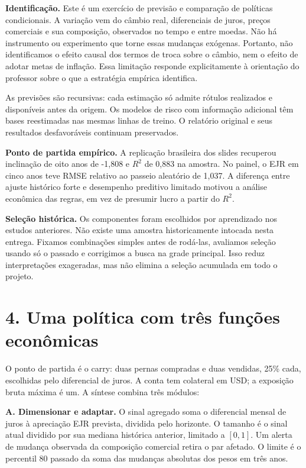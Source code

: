 \documentclass[11pt,a4paper]{article}
\begin{document}
\textbf{Identificação.} Este é um exercício de previsão e comparação de políticas condicionais. A variação vem do câmbio real, diferenciais de juros, preços comerciais e sua composição, observados no tempo e entre moedas. Não há instrumento ou experimento que torne essas mudanças exógenas. Portanto, não identificamos o efeito causal dos termos de troca sobre o câmbio, nem o efeito de adotar metas de inflação. Essa limitação responde explicitamente à orientação do professor sobre o que a estratégia empírica identifica.

As previsões são recursivas: cada estimação só admite rótulos realizados e disponíveis antes da origem. Os modelos de risco com informação adicional têm bases reestimadas nas mesmas linhas de treino. O relatório original e seus resultados desfavoráveis continuam preservados.

\textbf{Ponto de partida empírico.} A replicação brasileira dos slides recuperou inclinação de oito anos de -1,808 e $R^2$ de 0,883 na amostra. No painel, o EJR em cinco anos teve RMSE relativo ao passeio aleatório de 1,037. A diferença entre ajuste histórico forte e desempenho preditivo limitado motivou a análise econômica das regras, em vez de presumir lucro a partir do $R^2$.

\textbf{Seleção histórica.} Os componentes foram escolhidos por aprendizado nos estudos anteriores. Não existe uma amostra historicamente intocada nesta entrega. Fixamos combinações simples antes de rodá-las, avaliamos seleção usando só o passado e corrigimos a busca na grade principal. Isso reduz interpretações exageradas, mas não elimina a seleção acumulada em todo o projeto.

\clearpage
\section*{4. Uma política com três funções econômicas}

O ponto de partida é o carry: duas pernas compradas e duas vendidas, 25\% cada, escolhidas pelo diferencial de juros. A conta tem colateral em USD; a exposição bruta máxima é um. A síntese combina três módulos:

\textbf{A. Dimensionar e adaptar.} O sinal agregado soma o diferencial mensal de juros à apreciação EJR prevista, dividida pelo horizonte. O tamanho é o sinal atual dividido por sua mediana histórica anterior, limitado a $[0,1]$. Um alerta de mudança observada da composição comercial retira o par afetado. O limite é o percentil 80 passado da soma das mudanças absolutas dos pesos em três anos.
\end{document}
